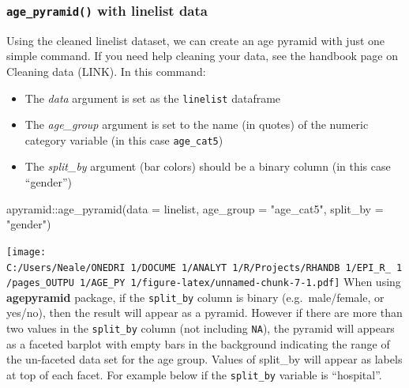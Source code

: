 \documentclass[
]{article}
\newenvironment{Shaded}{\begin{snugshade}}{\end{snugshade}}
\newcommand{\DataTypeTok}[1]{\textcolor[rgb]{0.87,0.87,0.75}{#1}}
\newcommand{\KeywordTok}[1]{\textcolor[rgb]{0.94,0.87,0.69}{#1}}
\newcommand{\NormalTok}[1]{\textcolor[rgb]{0.80,0.80,0.80}{#1}}
\newcommand{\OperatorTok}[1]{\textcolor[rgb]{0.94,0.94,0.82}{#1}}
\newcommand{\StringTok}[1]{\textcolor[rgb]{0.80,0.58,0.58}{#1}}
\providecommand{\tightlist}{%
  \setlength{\itemsep}{0pt}\setlength{\parskip}{0pt}}
\begin{document}
\hypertarget{age_pyramid-with-linelist-data}{%
\subsubsection{\texorpdfstring{\texttt{age\_pyramid()} with linelist
data}{age\_pyramid() with linelist data}}\label{age_pyramid-with-linelist-data}}

Using the cleaned linelist dataset, we can create an age pyramid with
just one simple command. If you need help cleaning your data, see the
handbook page on Cleaning data (LINK). In this command:

\begin{itemize}
\tightlist
\item
  The \emph{data} argument is set as the \texttt{linelist} dataframe\\
\item
  The \emph{age\_group} argument is set to the name (in quotes) of the
  numeric category variable (in this case \texttt{age\_cat5})\\
\item
  The \emph{split\_by} argument (bar colors) should be a binary column
  (in this case ``gender'')
\end{itemize}

\begin{Shaded}
\begin{Highlighting}[]
\NormalTok{apyramid}\OperatorTok{::}\KeywordTok{age\_pyramid}\NormalTok{(}\DataTypeTok{data =}\NormalTok{ linelist,}
                      \DataTypeTok{age\_group =} \StringTok{"age\_cat5"}\NormalTok{,}
                      \DataTypeTok{split\_by =} \StringTok{"gender"}\NormalTok{)}
\end{Highlighting}
\end{Shaded}

\texttt{[image: C:/Users/Neale/ONEDRI~1/DOCUME~1/ANALYT~1/R/Projects/RHANDB~1/EPI\_R\_~1/pages\_OUTPU~1/AGE\_PY~1/figure-latex/unnamed-chunk-7-1.pdf]}
When using \textbf{agepyramid} package, if the \texttt{split\_by} column
is binary (e.g.~male/female, or yes/no), then the result will appear as
a pyramid. However if there are more than two values in the
\texttt{split\_by} column (not including \texttt{NA}), the pyramid will
appears as a faceted barplot with empty bars in the background
indicating the range of the un-faceted data set for the age group.
Values of split\_by will appear as labels at top of each facet. For
example below if the \texttt{split\_by} variable is ``hospital''.
\end{document}
